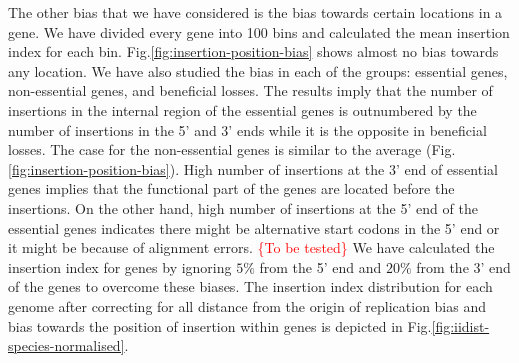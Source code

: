\documentclass[12pt,letterpaper]{article}
\begin{document}
The other bias that we have considered is the bias towards certain locations in a gene. We have divided every gene into 100 bins and calculated the mean insertion index for each bin. Fig.\@ \ref{fig:insertion-position-bias} shows almost no bias towards any location. We have also studied the bias in each of the groups: essential genes, non-essential genes, and beneficial losses. The results imply that the number of insertions in the internal region of the essential genes is outnumbered by the number of insertions in the 5' and 3' ends while it is the opposite in beneficial losses. The case for the non-essential genes is similar to the average (Fig.\@ \ref{fig:insertion-position-bias}). High number of insertions at the 3' end of essential genes implies that the functional part of the genes are located before the insertions. On the other hand, high number of insertions at the 5' end of the essential genes indicates there might be alternative start codons in the 5' end or it might be because of alignment errors. \textcolor{red}{\{To be tested\}} We have calculated the insertion index for genes by ignoring $5\%$ from the 5' end and $20\%$ from the 3' end of the genes to overcome these biases. The insertion index distribution for each genome after correcting for all distance from the origin of replication bias and bias towards the position of insertion within genes is depicted in Fig.\@ \ref{fig:iidist-species-normalised}.
\end{document}
